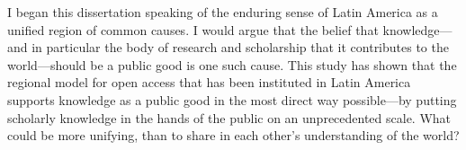 I began this dissertation speaking of the enduring sense of Latin America as a unified region of common causes. I would argue that the belief that knowledge—and in particular the body of research and scholarship that it contributes to the world—should be a public good is one such cause. This study has shown that the regional model for open access that has been instituted in Latin America supports knowledge as a public good in the most direct way possible—by putting scholarly knowledge in the hands of the public on an unprecedented scale. What could be more unifying, than to share in each other's understanding of the world?




